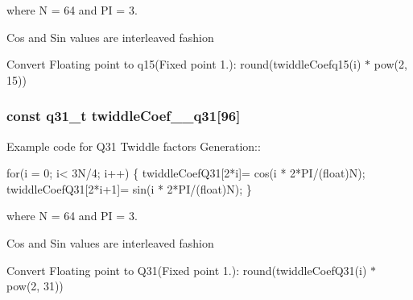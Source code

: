 \begin{DoxyParagraph}{}
where N = 64 and PI = 3. 
\end{DoxyParagraph}
\begin{DoxyParagraph}{}
Cos and Sin values are interleaved fashion 
\end{DoxyParagraph}
\begin{DoxyParagraph}{}
Convert Floating point to q15(Fixed point 1.)\+: round(twiddle\+Coefq15(i) $\ast$ pow(2, 15)) 
\end{DoxyParagraph}
\subsubsection[{\texorpdfstring{twiddle\+Coef\+\_\+64\+\_\+q31}{twiddleCoef_64_q31}}]{\setlength{\rightskip}{0pt plus 5cm}const q31\+\_\+t twiddle\+Coef\+\_\+\_\+q31\mbox{[}96\mbox{]}}\hypertarget{group__CFFT__CIFFT_ga6e0a7e941a25a0d74b2e6590307de47e}{}\label{group__CFFT__CIFFT_ga6e0a7e941a25a0d74b2e6590307de47e}
\begin{DoxyParagraph}{}
Example code for Q31 Twiddle factors Generation\+:\+: 
\end{DoxyParagraph}
\begin{DoxyParagraph}{}

\begin{DoxyPre}for(i = 0; i< 3N/4; i++)
\{
   twiddleCoefQ31[2*i]= cos(i * 2*PI/(float)N);
   twiddleCoefQ31[2*i+1]= sin(i * 2*PI/(float)N);
\} \end{DoxyPre}
 
\end{DoxyParagraph}
\begin{DoxyParagraph}{}
where N = 64 and PI = 3. 
\end{DoxyParagraph}
\begin{DoxyParagraph}{}
Cos and Sin values are interleaved fashion 
\end{DoxyParagraph}
\begin{DoxyParagraph}{}
Convert Floating point to Q31(Fixed point 1.)\+: round(twiddle\+Coef\+Q31(i) $\ast$ pow(2, 31)) 
\end{DoxyParagraph}
